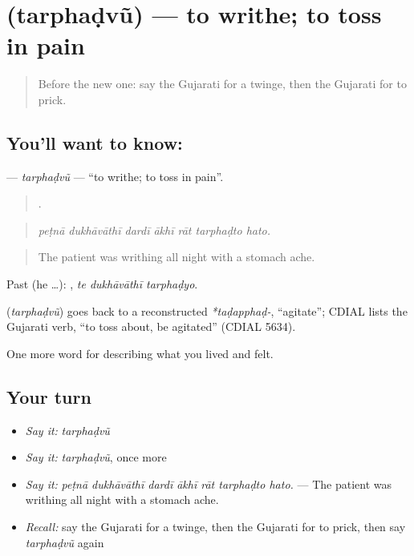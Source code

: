\section[\texorpdfstring{\gu{તરફડવું} (tarphaḍvũ)}{તરફડવું (tarphaḍvũ)}]{ (tarphaḍvũ) — to writhe; to toss in pain}

\label{lesson:GU-C483-tarphadvu}



\begin{quote}
Before the new one: say the Gujarati for a twinge, then the Gujarati for to prick.
\end{quote}

\subsection*{You'll want to know: }
\textbf{} — \emph{tarphaḍvũ} — \textquotedblleft{}to writhe; to toss in pain\textquotedblright{}.

\begin{quote}
      .
\end{quote}

\begin{quote}
\emph{peṭnā dukhāvāthī dardī ākhī rāt tarphaḍto hato.}
\end{quote}

\begin{quote}
The patient was writhing all night with a stomach ache.
\end{quote}

Past (he …):   , \emph{te dukhāvāthī tarphaḍyo}.

\begin{cousinweb}
\textbf{} (\emph{tarphaḍvũ}) goes back to a reconstructed \emph{*taḍapphaḍ-}, \textquotedblleft{}agitate\textquotedblright{}; CDIAL lists the Gujarati verb, \textquotedblleft{}to toss about, be agitated\textquotedblright{} (CDIAL 5634).
\end{cousinweb}

\begin{grammarlens}[title={What you've built}]
One more word for describing what you lived and felt.
\end{grammarlens}

\subsection*{Your turn}
\begin{itemize}
\raggedright
  \item \emph{Say it:} \emph{tarphaḍvũ}
  \item \emph{Say it:} \emph{tarphaḍvũ}, once more
  \item \emph{Say it:} \emph{peṭnā dukhāvāthī dardī ākhī rāt tarphaḍto hato.} — The patient was writhing all night with a stomach ache.
  \item \emph{Recall:} say the Gujarati for a twinge, then the Gujarati for to prick, then say \emph{tarphaḍvũ} again
\end{itemize}

